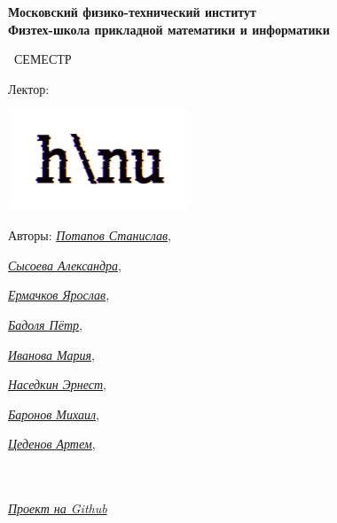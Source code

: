 \begin{titlepage}
	\clearpage\thispagestyle{empty}
	\centering
	
	\textbf{Московский физико-технический институт \\ Физтех-школа прикладной математики и информатики}
	\vspace{33ex}
	
	{\textbf{\FullCourseNameFirstPart}}
	
	\SemesterNumber\ СЕМЕСТР  
	\vspace{1ex}
	
	Лектор: \textit{\LecturerInitials}
	
	\includegraphics[width=0.4\textwidth]{logo_ltc.png}

	\begin{flushright}
		\noindent
		Авторы: \href{https://vk.com/invader17}{\textit{Потапов Станислав}}, 
  
    \href{https://vk.com/salexame}{\textit{ Сысоева Александра}},

    \href{https://vk.com/eryar}{\textit{Ермачков Ярослав}},
    
    \href{https://vk.com/akzium}{\textit{Бадоля Пётр}},
    
    \href{https://vk.com/mivanova1604}{\textit{Иванова Мария}},
    
    \href{https://vk.com/d3voo}{\textit{Наседкин Эрнест}},
    
    \href{https://vk.com/id389655743}{\textit{Баронов Михаил}},

    \href{https://vk.com/darkness11235}{\textit{Цеденов Артем}},
  
		\\ \\
  
		\href{\GithubLink}{\textit{Проект на Github}}
	\end{flushright}
	
	\vfill
	\CourseDate
	\pagebreak
\end{titlepage}